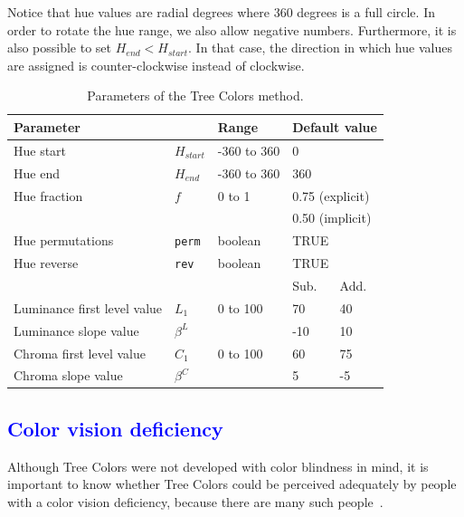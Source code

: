 \documentclass[journal]{vgtc}                %
\newcommand{\changedM}[1]{\textcolor{blue}{#1}}
\begin{document}
Notice that hue values are radial degrees where 360 degrees is a full circle. In order to rotate the hue range, we also allow negative numbers. Furthermore, it is also possible to set $H_{end} < H_{start}$. In that case, the direction in which hue values are assigned is counter-clockwise instead of clockwise.

\begin{table}[!htb]
\begin{footnotesize}
\begin{center}
\begin{tabular}{lllll}
\toprule
\multicolumn{2}{l}{Parameter    } & Range & \multicolumn{2}{l}{Default value} \\
\midrule
Hue start 				& $H_{start}$ &-360 to 360  & \multicolumn{2}{l}{0}      \\
Hue end   				& $H_{end}$ & -360 to 360 & \multicolumn{2}{l}{360}       \\
Hue fraction 				& $f$	& 0 to 1 & \multicolumn{2}{l}{0.75 (explicit)} \\
					&	&	 & \multicolumn{2}{l}{0.50 (implicit)} \\
Hue permutations 			& \texttt{perm} & boolean & \multicolumn{2}{l}{TRUE}      \\
Hue reverse   			& \texttt{rev} & boolean  & \multicolumn{2}{l}{TRUE}    \\
\cmidrule(r){4-5}
					&		&		& Sub. & Add. \\
\cmidrule(r){4-5}
Luminance first level value 	& $L_1$	& 0 to 100  & 70 & 40      \\
Luminance slope value 		& $\beta^L$ &       & -10  & 10      \\
Chroma first level value 		& $C_1$ &  0 to 100  & 60   & 75    \\
Chroma slope value 		& $\beta^C$ &     & 5   & -5    \\
\bottomrule
\end{tabular}
\end{center}
\end{footnotesize}
\caption{Parameters of the Tree Colors method.}\label{table:param}
\end{table}

\subsection{\changedM{Color vision deficiency}}
Although Tree Colors were not developed with color blindness in mind, it is important to know whether Tree Colors could be perceived adequately by people with a color vision deficiency, because there are many such people~\cite{birch12}.
\end{document}
